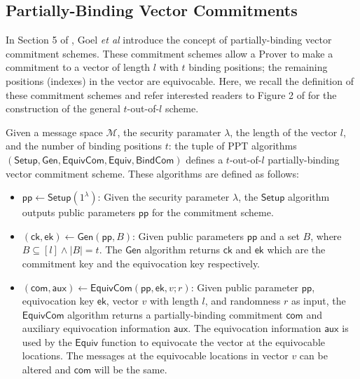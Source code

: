 \subsection{Partially-Binding Vector Commitments}
In Section 5 of \cite{StackingSigmas}, Goel {\em{et al}} introduce the concept of partially-binding vector commitment schemes. 
These commitment schemes allow a Prover to make a commitment to a vector of length $l$ with $t$ binding positions; 
the remaining positions (indexes) in the vector are equivocable. 
Here, we recall the definition of these commitment schemes and refer interested readers to Figure 2 of \cite{StackingSigmas} for the construction of the general $t$-out-of-$l$ 
scheme. 

\begin{definition}\label{def:comm_scheme}
  Given a message space $\mathcal M$, the security paramater $\lambda$, the length of the vector $l$, and the number of binding positions $t$: 
  the tuple of PPT algorithms $(\mathsf{Setup}, \mathsf{Gen}, \mathsf{EquivCom}, \mathsf{Equiv}, \mathsf{BindCom})$ defines a $t$-out-of-$l$ 
  partially-binding vector commitment scheme. These algorithms are defined as follows:
  \begin{itemize}
  \item $\mathsf{pp} \leftarrow \mathsf{Setup}(1^\lambda)$: Given the security parameter $\lambda$,
  the $\mathsf{Setup}$ algorithm outputs public parameters $\mathsf{pp}$ for the commitment scheme.
  
  \item $(\mathsf{ck},\mathsf{ek}) \leftarrow \mathsf{Gen}(\mathsf{pp},B)$: Given public parameters $\mathsf{pp}$ 
  and a set $B$, where $B \subseteq [l] \land |B| = t$. The $\mathsf{Gen}$ algorithm returns $\mathsf{ck}$ and $\mathsf{ek}$ which are the commitment key and the equivocation key respectively.

  \item $(\mathsf{com},\mathsf{aux}) \leftarrow \mathsf{EquivCom}(\mathsf{pp},\mathsf{ek},v;r)$: Given public parameter 
  $\mathsf{pp}$, equivocation key $\mathsf{ek}$, vector $v$ with length $l$, and randomness $r$ as input, the $\mathsf{EquivCom}$ algorithm returns a 
  partially-binding commitment $\mathsf{com}$ and auxiliary equivocation information $\mathsf{aux}$. The equivocation information $\mathsf{aux}$ is used by the $\mathsf{Equiv}$ function to equivocate the vector at the equivocable locations. The messages at the equivocable locations in vector $v$ can be altered and $\mathsf{com}$ will be the same.  


\end{itemize}
\end{definition}
